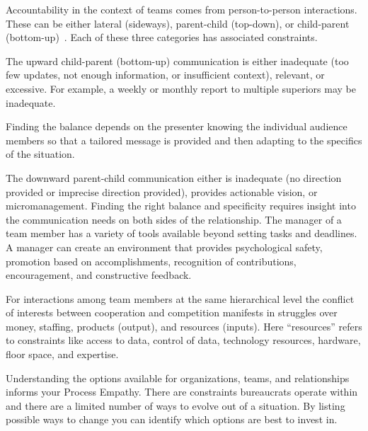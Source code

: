 
Accountability in the context of teams comes from person-to-person interactions. These can be either lateral (sideways), parent-child (top-down), or child-parent (bottom-up)~\cite{2014_Jorgensen}. Each of these three categories has associated constraints.

The upward child-parent (bottom-up) communication is either inadequate (too few updates, not enough information, or insufficient context), relevant, or excessive. For example, a weekly or monthly report to multiple superiors may be inadequate. 

Finding the balance depends on the presenter knowing the individual audience members so that a tailored message is provided and then adapting to the specifics of the situation. 

The downward parent-child communication either is inadequate (no direction provided or imprecise direction provided), provides actionable vision, or micromanagement. Finding the right balance and specificity requires insight into the communication needs on both sides of the relationship. The manager of a team member has a variety of tools available beyond setting tasks and deadlines. A manager can create an environment that provides psychological safety, promotion based on accomplishments, recognition of contributions, encouragement, and constructive feedback.

For interactions among team members at the same hierarchical level the conflict of interests between cooperation and competition manifests in struggles over money, staffing, products (output), and resources (inputs). Here ``resources''  refers to constraints like access to data, control of data, technology resources, hardware, floor space, and expertise. 





Understanding the options available for organizations, teams, and relationships informs your Process Empathy. There are constraints bureaucrats operate within and there are a limited number of ways to evolve out of a situation. By listing possible ways to change you can identify which options are best to invest in. 